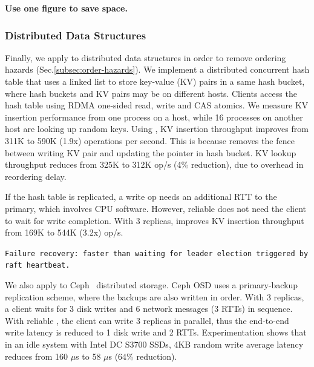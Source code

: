 \textbf{Use one figure to save space.}

\subsubsection{Distributed Data Structures}
\label{subsec:data-structure}

Finally, we apply \sys{} to distributed data structures in order to remove ordering hazards (Sec.\ref{subsec:order-hazards}).
We implement a distributed concurrent hash table that uses a linked list to store key-value (KV) pairs in a same hash bucket, where hash buckets and KV pairs may be on different hosts.
Clients access the hash table using RDMA one-sided read, write and CAS atomics.
We measure KV insertion performance from one process on a host, while 16 processes on another host are looking up random keys.
Using \sys{}, KV insertion throughput improves from 311K to 590K (1.9x) operations per second.
This is because \sys{} removes the fence between writing KV pair and updating the pointer in hash bucket.
KV lookup throughput reduces from 325K to 312K op/s (4\% reduction), due to overhead in reordering delay.

If the hash table is replicated, a write op needs an additional RTT to the primary, which involves CPU software. However, reliable \sys{} does not need the client to wait for write completion.
With 3 replicas, \sys{} improves KV insertion throughput from 169K to 544K (3.2x) op/s.

\texttt{Failure recovery: faster than waiting for leader election triggered by raft heartbeat.}

We also apply \sys{} to Ceph~\cite{weil2006ceph} distributed storage. Ceph OSD uses a primary-backup replication scheme, where the backups are also written in order. With 3 replicas, a client waits for 3 disk writes and 6 network messages (3 RTTs) in sequence. With reliable \sys{}, the client can write 3 replicas in parallel, thus the end-to-end write latency is reduced to 1 disk write and 2 RTTs. Experimentation shows that in an idle system with Intel DC S3700 SSDs, 4KB random write average latency reduces from 160 $\mu$s to 58 $\mu$s (64\% reduction).




